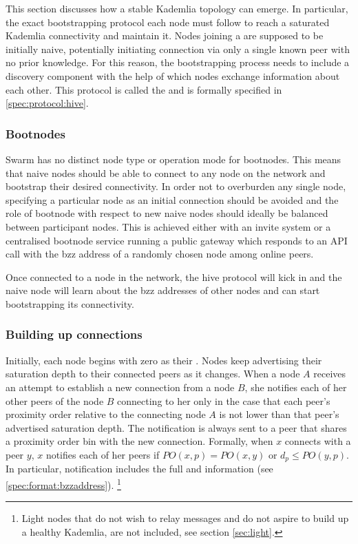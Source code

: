  
This section discusses how a stable Kademlia topology can emerge. In particular, the exact bootstrapping protocol each node must follow to reach a saturated Kademlia connectivity and maintain it. Nodes joining a  are supposed to be initially naive, potentially initiating connection via only a single known peer with no prior knowledge. For this reason, the bootstrapping process needs to include a discovery component with the help of which nodes exchange information about each other. This protocol is called the  and is formally specified in \ref{spec:protocol:hive}.

\subsubsection{Bootnodes}

Swarm has no distinct node type or operation  mode for bootnodes. This means that naive nodes should be able to connect to any node on the  network and bootstrap their desired connectivity. In order not to overburden any single node, specifying a particular node as an initial connection should be avoided and the role of bootnode with respect to new naive nodes should ideally be balanced between participant nodes. This is achieved either with an invite system or a centralised bootnode service running a public gateway which responds to an API call with the bzz address of a randomly chosen node among online peers. 

Once connected to a node in the network, the hive protocol will kick in and the naive node will learn about the bzz addresses of other nodes and can start bootstrapping its connectivity.

\subsubsection{Building up connections}

Initially, each node begins with zero as their . Nodes keep advertising their saturation depth to their connected peers as it changes. When a node $A$ receives an attempt to establish a new connection from a node $B$, she notifies each of her other peers of the node $B$ connecting to her only in the case that each peer's proximity order relative to the connecting node $A$ is not lower than that peer's advertised saturation depth. The notification is always sent to a peer that shares a proximity order bin with the new connection. Formally, when $x$ connects with a peer $y$, $x$ notifies each of her peers if $\mathit{PO}(x, p) = \mathit{PO}(x, y)$ or $d_p\leq \mathit{PO}(y, p)$. In particular, notification includes the full  and  information (see \ref{spec:format:bzzaddress}).%
%
\footnote{Light nodes that do not wish to relay messages and do not aspire to build up a healthy Kademlia, are not included, see section \ref{sec:light}. }

